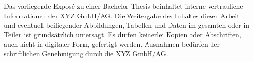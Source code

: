 Das vorliegende Exposé zu einer Bachelor Thesis beinhaltet interne vertrauliche Informationen der XYZ GmbH/AG. Die Weitergabe des Inhaltes dieser Arbeit und eventuell beiliegender Abbildungen, Tabellen und Daten im gesamten oder in Teilen ist grundsätzlich untersagt. Es dürfen keinerlei Kopien oder Abschriften, auch nicht in digitaler Form, gefertigt werden. Ausnahmen bedürfen der schriftlichen Genehmigung durch die XYZ GmbH/AG.
\newpage